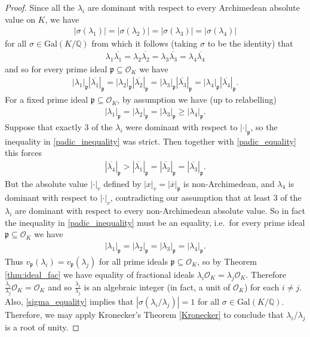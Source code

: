 \documentclass{article}\usepackage[a4paper,margin=20mm]{geometry}
\newcommand{\Q}{\mathbb{Q}}
\newcommand{\p}{\mathfrak{p}}
\renewcommand{\O}{\mathcal{O}}
\begin{document}
\begin{proof}
	Since all the $\lambda_i$ are dominant with respect to every Archimedean absolute value on $K$, we have
	\begin{align} \label{sigma_equality}
		|\sigma(\lambda_1)| = |\sigma(\lambda_2)| = |\sigma(\lambda_3)| = |\sigma(\lambda_4)|
	\end{align}
	for all $\sigma \in \text{Gal}(K/\Q)$ from which it follows (taking $\sigma$ to be the identity) that
	\begin{align*}
		\lambda_1 \overline{\lambda_1} = \lambda_2 \overline{\lambda_2} = \lambda_3 \overline{\lambda_3} = \lambda_4 \overline{\lambda_4}
	\end{align*}
	and so for every prime ideal $\p \subseteq \O_K$ we have
	\begin{align} \label{padic_equality}
		|\lambda_1|_\p |\overline{\lambda_1}|_\p = |\lambda_2|_\p |\overline{\lambda_2}|_\p = |\lambda_3|_\p |\overline{\lambda_3}|_\p = |\lambda_4|_\p |\overline{\lambda_4}|_\p.
	\end{align}
	For a fixed prime ideal $\p \subseteq \O_K$, by assumption we have (up to relabelling)
	\begin{align} \label{padic_inequality} 
		|\lambda_1|_\p = |\lambda_2|_\p = |\lambda_3|_\p \geq |\lambda_4|_\p.
	\end{align}
	Suppose that exactly 3 of the $\lambda_i$ were dominant with respect to $|\cdot|_\p$, so the inequality in \eqref{padic_inequality} was strict. Then together with \eqref{padic_equality} this forces
	\begin{align*}
		|\overline{\lambda_4}|_\p > |\overline{\lambda_1}|_\p = |\overline{\lambda_2}|_\p = |\overline{\lambda_3}|_\p.
	\end{align*}
	But the absolute value $|\cdot|_v$ defined by $|x|_v = |\overline{x}|_\p$ is non-Archimedean, and $\lambda_4$ is dominant with respect to $|\cdot|_v$, contradicting our assumption that at least 3 of the $\lambda_i$ are dominant with respect to every non-Archimedean absolute value. So in fact the inequality in \eqref{padic_inequality} must be an equality, i.e.\ for every prime ideal $\p \subseteq \O_K$ we have
	\begin{align*}
		|\lambda_1|_\p = |\lambda_2|_\p = |\lambda_3|_\p = |\lambda_4|_\p.
	\end{align*}
	Thus $v_\p(\lambda_i) = v_\p(\lambda_j)$ for all prime ideals $\p \subseteq \O_K$, so by Theorem \ref{thm:ideal_fac} we have equality of fractional ideals $\lambda_i \O_K = \lambda_j \O_K$. Therefore $\frac{\lambda_i}{\lambda_j} \O_K = \O_K$ and so $\frac{\lambda_i}{\lambda_j}$ is an algebraic integer (in fact, a unit of $\O_K$) for each $i \neq j$. Also, \eqref{sigma_equality} implies that $\left|\sigma\left(\lambda_i/\lambda_j\right)\right| = 1$ for all $\sigma \in \text{Gal}(K/\Q)$. Therefore, we may apply Kronecker's Theorem \ref{Kronecker} to conclude that $\lambda_i/\lambda_j$ is a root of unity.
\end{proof}
\end{document}
